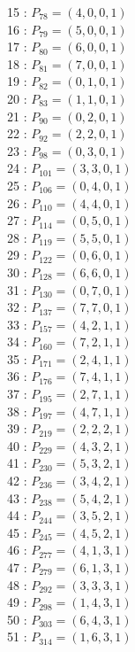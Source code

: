 \documentclass{article}
\begin{document}
{\begin{multicols}{3}
15 : $P_{78}=( 4, 0, 0, 1 )$\\
16 : $P_{79}=( 5, 0, 0, 1 )$\\
17 : $P_{80}=( 6, 0, 0, 1 )$\\
18 : $P_{81}=( 7, 0, 0, 1 )$\\
19 : $P_{82}=( 0, 1, 0, 1 )$\\
20 : $P_{83}=( 1, 1, 0, 1 )$\\
21 : $P_{90}=( 0, 2, 0, 1 )$\\
22 : $P_{92}=( 2, 2, 0, 1 )$\\
23 : $P_{98}=( 0, 3, 0, 1 )$\\
24 : $P_{101}=( 3, 3, 0, 1 )$\\
25 : $P_{106}=( 0, 4, 0, 1 )$\\
26 : $P_{110}=( 4, 4, 0, 1 )$\\
27 : $P_{114}=( 0, 5, 0, 1 )$\\
28 : $P_{119}=( 5, 5, 0, 1 )$\\
29 : $P_{122}=( 0, 6, 0, 1 )$\\
30 : $P_{128}=( 6, 6, 0, 1 )$\\
31 : $P_{130}=( 0, 7, 0, 1 )$\\
32 : $P_{137}=( 7, 7, 0, 1 )$\\
33 : $P_{157}=( 4, 2, 1, 1 )$\\
34 : $P_{160}=( 7, 2, 1, 1 )$\\
35 : $P_{171}=( 2, 4, 1, 1 )$\\
36 : $P_{176}=( 7, 4, 1, 1 )$\\
37 : $P_{195}=( 2, 7, 1, 1 )$\\
38 : $P_{197}=( 4, 7, 1, 1 )$\\
39 : $P_{219}=( 2, 2, 2, 1 )$\\
40 : $P_{229}=( 4, 3, 2, 1 )$\\
41 : $P_{230}=( 5, 3, 2, 1 )$\\
42 : $P_{236}=( 3, 4, 2, 1 )$\\
43 : $P_{238}=( 5, 4, 2, 1 )$\\
44 : $P_{244}=( 3, 5, 2, 1 )$\\
45 : $P_{245}=( 4, 5, 2, 1 )$\\
46 : $P_{277}=( 4, 1, 3, 1 )$\\
47 : $P_{279}=( 6, 1, 3, 1 )$\\
48 : $P_{292}=( 3, 3, 3, 1 )$\\
49 : $P_{298}=( 1, 4, 3, 1 )$\\
50 : $P_{303}=( 6, 4, 3, 1 )$\\
51 : $P_{314}=( 1, 6, 3, 1 )$\\

\end{multicols}}
\end{document}
